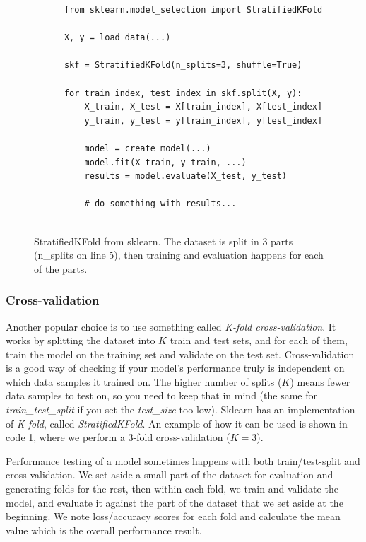 \begin{figure}[h]
  \begin{code}    
      \begin{verbatim}
      from sklearn.model_selection import StratifiedKFold
  
      X, y = load_data(...)
  
      skf = StratifiedKFold(n_splits=3, shuffle=True)
  
      for train_index, test_index in skf.split(X, y):
          X_train, X_test = X[train_index], X[test_index]
          y_train, y_test = y[train_index], y[test_index]
  
          model = create_model(...)
          model.fit(X_train, y_train, ...)
          results = model.evaluate(X_test, y_test)
  
          # do something with results...
  
      \end{verbatim}
      \caption{StratifiedKFold from sklearn. The dataset is split in 3 parts (n\_splits on line 5), then training and evaluation happens for each of the parts.}
      \label{code:sklearn_k_fold}
  \end{code}
\end{figure}
  

\subsubsection{Cross-validation}
Another popular choice is to use something called \textit{K-fold cross-validation}. It works by splitting the dataset into $K$ train and test sets, and for each of them, train the model on the training set and validate on the test set. Cross-validation is a good way of checking if your model's performance truly is independent on which data samples it trained on. The higher number of splits ($K$) means fewer data samples to test on, so you need to keep that in mind (the same for \textit{train\_test\_split} if you set the \textit{test\_size} too low). Sklearn has an implementation of \textit{K-fold}, called \textit{StratifiedKFold}. An example of how it can be used is shown in code \ref{code:sklearn_k_fold}, where we perform a 3-fold cross-validation ($K = 3$). 

Performance testing of a model sometimes happens with both train/test-split and cross-validation. We set aside a small part of the dataset for evaluation and generating folds for the rest, then within each fold, we train and validate the model, and evaluate it against the part of the dataset that we set aside at the beginning. We note loss/accuracy scores for each fold and calculate the mean value which is the overall performance result.

